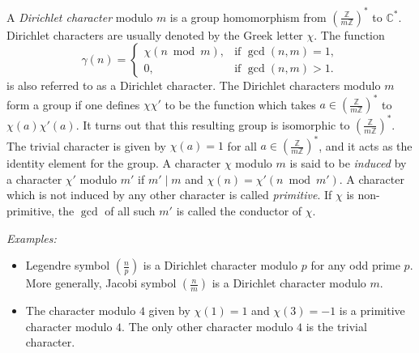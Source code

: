 \documentclass[12pt]{article}
\newcommand*{\legsym}{\genfrac{(}{)}{}{}}
\begin{document}

A \emph{Dirichlet character} modulo $m$ is a group homomorphism from $\left(\frac{\mathbb{Z}}{m\mathbb{Z}}\right)^*$ to $\mathbb{C^*}$. Dirichlet characters are usually denoted by the Greek letter $\chi$. The function \begin{equation*}
\gamma(n)=\begin{cases}
\chi(n\bmod m),&\text{if }\gcd(n,m)=1,\\
0,&\text{if }\gcd(n,m)>1. \end{cases}
\end{equation*}
is also referred to as a Dirichlet character.
The Dirichlet characters modulo $m$ form a group if one defines $\chi\chi'$ to be the function which takes $a\in\left(\frac{\mathbb{Z}}{m\mathbb{Z}}\right)^*$ to $\chi(a)\chi'(a)$.  It turns out that this resulting group is isomorphic to $\left(\frac{\mathbb{Z}}{m\mathbb{Z}}\right)^*$.  The trivial character is given by $\chi(a)=1$ for all $a\in\left(\frac{\mathbb{Z}}{m\mathbb{Z}}\right)^*$, and it acts as the identity element for the group.  
A character $\chi$ modulo $m$ is said to be \emph{induced} by a character $\chi'$ modulo $m'$ if $m'\mid m$ and $\chi(n)=\chi'(n\bmod m')$. A character which is not induced by any other character is called \emph{primitive}.
If $\chi$ is non-primitive, the $\gcd$ of all such $m'$ is called the conductor of $\chi$.

\emph{Examples:}
\begin{itemize}
\item Legendre symbol $\legsym{n}{p}$ is a Dirichlet character modulo $p$ for any odd prime $p$. More generally, Jacobi symbol $\legsym{n}{m}$ is a Dirichlet character modulo $m$.
\item The character modulo $4$ given by $\chi(1)=1$ and $\chi(3)=-1$ is a primitive character modulo $4$. The only other character modulo $4$ is the trivial character.
\end{itemize}
\end{document}
